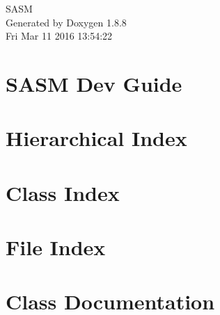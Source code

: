 \documentclass[twoside]{book}
\newcommand{\+}{\discretionary{\mbox{\scriptsize$\hookleftarrow$}}{}{}}
\newcommand{\clearemptydoublepage}{%
  \newpage{\pagestyle{empty}\cleardoublepage}%
}
\begin{document}
\hypersetup{pageanchor=false,
             bookmarks=true,
             bookmarksnumbered=true,
             pdfencoding=unicode
            }
\begin{titlepage}
\vspace*{7cm}
\begin{center}%
{\Large S\+A\+S\+M }\\
\vspace*{1cm}
{\large Generated by Doxygen 1.8.8}\\
\vspace*{0.5cm}
{\small Fri Mar 11 2016 13:54:22}\\
\end{center}
\end{titlepage}
\clearemptydoublepage
\tableofcontents
\clearemptydoublepage
{}
\hypersetup{pageanchor=true}

\chapter{S\+A\+S\+M Dev Guide}
\label{index}\hypertarget{index}{}
\chapter{Hierarchical Index}

\chapter{Class Index}

\chapter{File Index}

\chapter{Class Documentation}



























\end{document}
